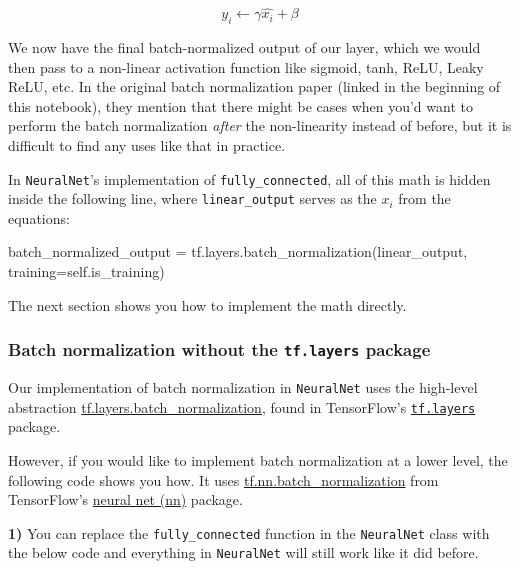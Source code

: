 \documentclass[11pt]{article}
\newenvironment{Shaded}{}{}
\newcommand{\NormalTok}[1]{{#1}}
\newcommand{\VariableTok}[1]{\textcolor[rgb]{0.10,0.09,0.49}{{#1}}}
\newcommand{\OperatorTok}[1]{\textcolor[rgb]{0.40,0.40,0.40}{{#1}}}
\begin{document}
\[
y_i \leftarrow \gamma \hat{x_i} + \beta
\]

We now have the final batch-normalized output of our layer, which we
would then pass to a non-linear activation function like sigmoid, tanh,
ReLU, Leaky ReLU, etc. In the original batch normalization paper (linked
in the beginning of this notebook), they mention that there might be
cases when you'd want to perform the batch normalization \emph{after}
the non-linearity instead of before, but it is difficult to find any
uses like that in practice.

In \texttt{NeuralNet}'s implementation of \texttt{fully\_connected}, all
of this math is hidden inside the following line, where
\texttt{linear\_output} serves as the \(x_i\) from the equations:

\begin{Shaded}
\begin{Highlighting}[]
\NormalTok{batch_normalized_output }\OperatorTok{=}\NormalTok{ tf.layers.batch_normalization(linear_output, training}\OperatorTok{=}\VariableTok{self}\NormalTok{.is_training)}
\end{Highlighting}
\end{Shaded}

The next section shows you how to implement the math directly.

    \hypertarget{batch-normalization-without-the-tf.layers-package}{%
\subsubsection{\texorpdfstring{Batch normalization without the
\texttt{tf.layers}
package}{Batch normalization without the tf.layers package}}\label{batch-normalization-without-the-tf.layers-package}}

Our implementation of batch normalization in \texttt{NeuralNet} uses the
high-level abstraction
\href{https://www.tensorflow.org/api_docs/python/tf/layers/batch_normalization}{tf.layers.batch\_normalization},
found in TensorFlow's
\href{https://www.tensorflow.org/api_docs/python/tf/layers}{\texttt{tf.layers}}
package.

However, if you would like to implement batch normalization at a lower
level, the following code shows you how. It uses
\href{https://www.tensorflow.org/api_docs/python/tf/nn/batch_normalization}{tf.nn.batch\_normalization}
from TensorFlow's
\href{https://www.tensorflow.org/api_docs/python/tf/nn}{neural net (nn)}
package.

\textbf{1)} You can replace the \texttt{fully\_connected} function in
the \texttt{NeuralNet} class with the below code and everything in
\texttt{NeuralNet} will still work like it did before.
\end{document}

